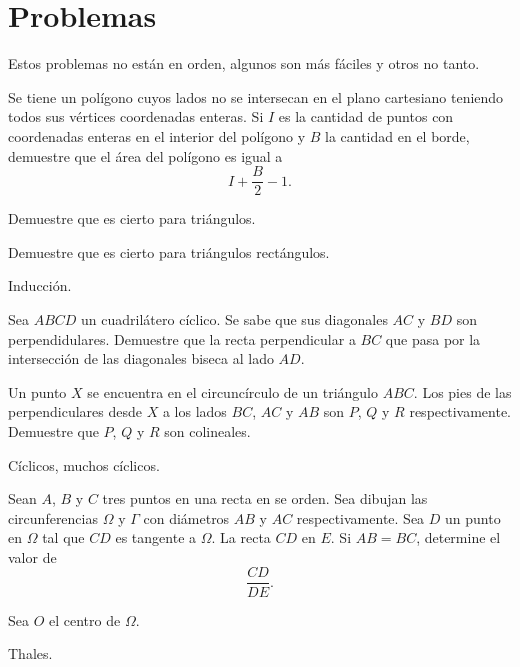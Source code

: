 \section{Problemas}
Estos problemas no están en orden,
algunos son más fáciles y otros
no tanto.
\begin{problem}
Se tiene un polígono cuyos lados no se intersecan
en el plano cartesiano
teniendo todos  sus vértices coordenadas enteras.
Si $I$ es la cantidad de puntos
con coordenadas enteras en el interior del polígono
y $B$ la cantidad
en el borde, demuestre que el área del polígono
es igual a
\[I + \frac{B}2 - 1.\]
\begin{hints}
	\begin{hint}
		Demuestre que es cierto para triángulos.
	\end{hint}
	\begin{hint}
		Demuestre que es cierto para triángulos rectángulos.
	\end{hint}
	\begin{hint}
		Inducción.
	\end{hint}
\end{hints}
\end{problem}

\begin{problem}
Sea $ABCD$ un cuadrilátero cíclico. Se sabe que
sus diagonales $AC$ y $BD$ son perpendidulares. Demuestre que la recta
perpendicular a $BC$ que pasa por la intersección de las diagonales biseca
al lado $AD$.
\end{problem}

\begin{problem}
Un punto $X$ se encuentra en el circuncírculo de un triángulo $ABC$. Los pies de las perpendiculares
desde $X$ a los lados $BC$, $AC$ y $AB$ son $P$, $Q$ y $R$ respectivamente. Demuestre que $P$, $Q$ y $R$
son colineales.

\begin{hints}
	\begin{hint}
		Cíclicos, muchos cíclicos.
	\end{hint}
\end{hints}
\end{problem}

\begin{problem}
Sean $A$, $B$ y $C$ tres puntos en una recta en
se orden. Sea dibujan las circunferencias
$\Omega$ y $\Gamma$ con diámetros $AB$ y $AC$
respectivamente. Sea $D$ un punto en $\Omega$
tal que $CD$ es tangente a $\Omega$.
La recta $CD$
en $E$. Si $AB = BC$, determine el valor de
\[\frac{CD}{DE}.\]
\begin{hints}
	\begin{hint}
		Sea $O$ el centro de $\Omega$.
	\end{hint}
	\begin{hint}
		Thales.
	\end{hint}
\end{hints}
\end{problem}

